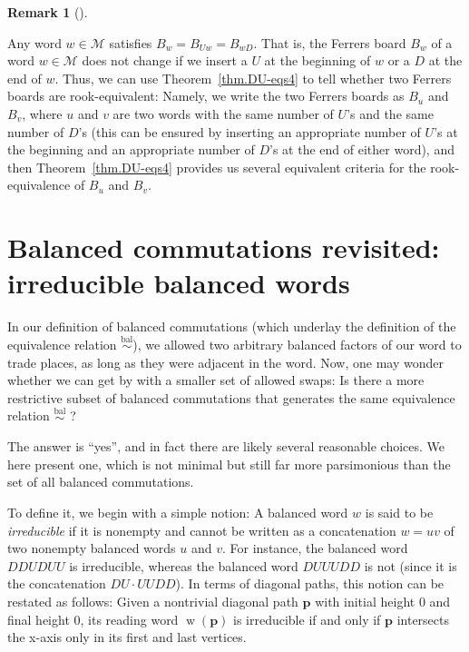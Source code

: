 \documentclass[numbers=enddot,12pt,final,onecolumn,notitlepage]{scrartcl}%
\theoremstyle{definition}
\newtheorem{remk}[theo]{Remark}
\newenvironment{remark}[1][]
{\begin{remk}[#1]\begin{leftbar}}
{\end{leftbar}\end{remk}}
\newcommand{\M}{\mathcal{M}}
\newcommand{\pp}{\mathbf{p}}
\newcommand{\w}{\operatorname{w}}
\newcommand{\balsim}{\overset{\operatorname*{bal}}{\sim}}
\newcommand{\tup}[1]{\left( #1 \right)}
\begin{document}

\begin{remark}
\label{rmk.rook.as-crit}
Any word $w \in \M$ satisfies $B_w = B_{Uw} = B_{wD}$.
That is, the Ferrers board $B_w$ of a word $w \in \M$ does not change if we insert a $U$ at the beginning of $w$ or a $D$ at the end of $w$.
Thus, we can use Theorem~\ref{thm.DU-eqs4} to tell whether two Ferrers boards are rook-equivalent:
Namely, we write the two Ferrers boards as $B_u$ and $B_v$, where $u$ and $v$ are two words with the same number of $U$'s and the same number of $D$'s (this can be ensured by inserting an appropriate number of $U$'s at the beginning and an appropriate number of $D$'s at the end of either word), and then Theorem~\ref{thm.DU-eqs4} provides us several equivalent criteria for the rook-equivalence of $B_u$ and $B_v$.
\end{remark}

\section{Balanced commutations revisited: irreducible balanced words}\label{sec:irredbal}

In our definition of balanced commutations (which underlay the definition of the equivalence relation $\balsim$), we allowed two arbitrary balanced factors of our word to trade places, as long as they were adjacent in the word.
Now, one may wonder whether we can get by with a smaller set of allowed swaps:
Is there a more restrictive subset of balanced commutations that generates the same equivalence relation $\balsim$ ?

The answer is ``yes'', and in fact there are likely several reasonable choices.
We  here present one, which is not minimal but still far more parsimonious than the set of all balanced commutations.

To define it, we begin with a simple notion:
A balanced word $w$ is said to be \emph{irreducible} if it is nonempty and cannot be written as a concatenation $w = uv$ of two nonempty balanced words $u$ and $v$.
For instance, the balanced word $DDUDUU$ is irreducible, whereas the balanced word $DUUUDD$ is not (since it is the concatenation $DU \cdot UUDD$).
In terms of diagonal paths, this notion can be restated as follows:
Given a nontrivial diagonal path $\pp$ with initial height $0$ and final height $0$, its reading word $\w\tup{\pp}$ is irreducible if and only if $\pp$ intersects the x-axis only in its first and last vertices.
\end{document}
